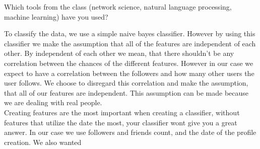 Which tools from the class (network science, natural language processing, machine learning) have you used? 

To classify the data, we use a simple naive bayes classifier. However by using this classifier we make the assumption that all of the features are independent of each other. By independent of each other we mean, that there shouldn't be any correlation between the chances of the different features. However in our case we expect to have a correlation between the followers and how many other users the user follows. We choose to disregard this correlation and make the assumption, that all of our features are independent. This assumption can be made because we are dealing with real people.\\
Creating features are the most important when creating a classifier, without features that utilize the date the most, your classifier wont give you a great answer. In our case we use followers and friends count, and the date of the profile creation. We also wanted 